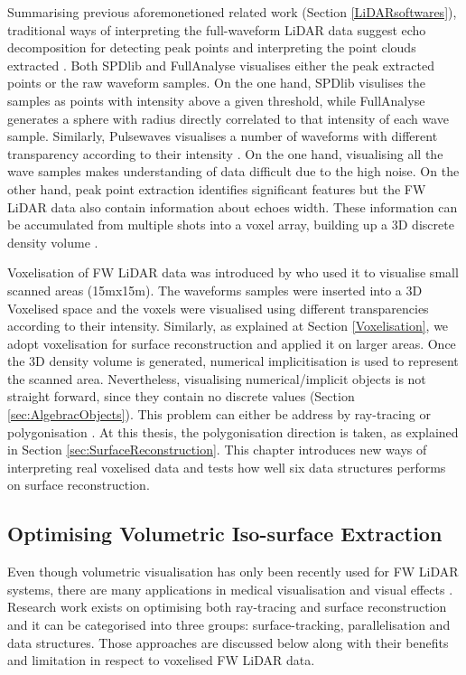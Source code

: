 \documentclass{subfiles}
\begin{document}
\par{\color{blue}Summarising previous aforemonetioned related work (Section \ref{LiDARsoftwares}), } traditional ways of interpreting the full-waveform LiDAR data suggest echo decomposition for detecting peak points and interpreting the point clouds extracted \cite{Wanger2006}. Both SPDlib \cite{Bunting2013} and FullAnalyse \cite{Chauve2009} visualises either the peak extracted points or the raw waveform samples. On the one hand, SPDlib visulises the samples as points with intensity above a given threshold, while FullAnalyse generates a sphere with radius directly correlated to that intensity of each wave sample. Similarly, Pulsewaves visualises a number of waveforms with different transparency according to their intensity \cite{Isenburg2012Pulsewaves}. {\color{blue}
On the one hand, visualising all the wave samples makes understanding of data difficult due to the high noise. On the other hand, peak point extraction identifies significant features but the FW LiDAR data also contain information about echoes width. These information can be accumulated from multiple shots into a voxel array, building up a 3D discrete density volume \cite{Miltiadou2014}.} 
\par Voxelisation of FW LiDAR data was introduced by \cite{Persson2005} who used it to visualise small scanned areas (15mx15m). The waveforms samples were inserted into a 3D Voxelised space and the voxels were visualised using different transparencies according to their intensity. Similarly, as explained at Section \ref{Voxelisation}, we adopt voxelisation for surface reconstruction and applied it on larger areas. Once the 3D density volume is generated, numerical implicitisation is used to represent the scanned area. Nevertheless, visualising numerical/implicit objects is not straight forward, since they contain no discrete values (Section \ref{sec:AlgebracObjects}). This problem can either be address by ray-tracing \cite{Hanrahan1983} or polygonisation \cite{Lorensen1987}. At this thesis, the polygonisation direction is taken, as explained in Section \ref{sec:SurfaceReconstruction}. This chapter introduces new ways of interpreting real voxelised data {\color{blue} and tests how well six data structures performs on surface reconstruction.} 


\subsection{Optimising Volumetric Iso-surface Extraction}
\par Even though volumetric visualisation has only been recently used for FW LiDAR systems, there are many applications in medical visualisation \cite{Levoy1998} \cite{Hadwiger2012} and visual effects \cite{Crassin2009} \cite{Laine2011SparseOctrees}. Research work exists on optimising both ray-tracing and surface reconstruction and it can be categorised into three groups: surface-tracking, parallelisation and data structures. Those approaches are discussed below along with their benefits and limitation in respect to voxelised FW LiDAR data.
\end{document}
